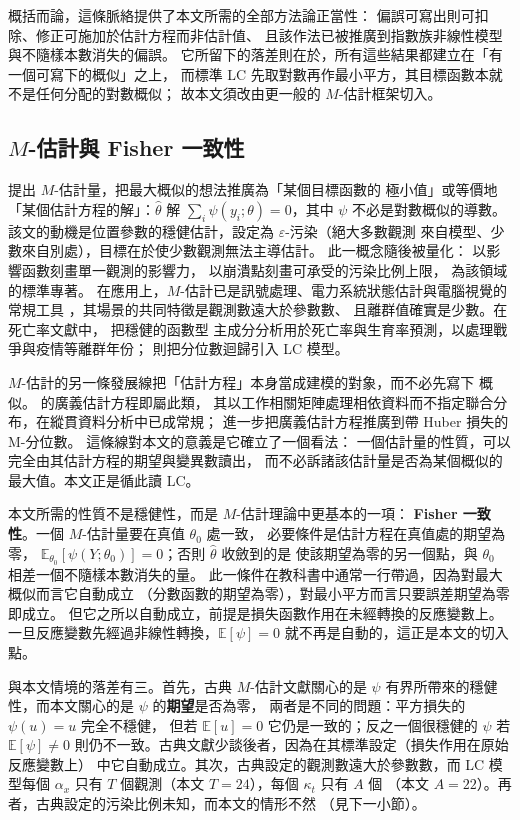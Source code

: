 \documentclass[UTF8, fontset=macnew, a4paper, 12pt]{ctexart}
\newcommand{\Ex}{\mathbb{E}}
\begin{document}
概括而論，這條脈絡提供了本文所需的全部方法論正當性：
偏誤可寫出則可扣除、修正可施加於估計方程而非估計值、
且該作法已被推廣到指數族非線性模型與不隨樣本數消失的偏誤。
它所留下的落差則在於，所有這些結果都建立在「有一個可寫下的概似」之上，
而標準 LC 先取對數再作最小平方，其目標函數本就不是任何分配的對數概似；
故本文須改由更一般的 $M$-估計框架切入。

\subsection{$M$-估計與 Fisher 一致性}

\citet{huber1964} 提出 $M$-估計量，把最大概似的想法推廣為「某個目標函數的
極小值」或等價地「某個估計方程的解」：$\hat\theta$ 解
$\sum_i\psi(y_i;\theta)=0$，其中 $\psi$ 不必是對數概似的導數。
該文的動機是位置參數的穩健估計，設定為 $\varepsilon$-污染（絕大多數觀測
來自模型、少數來自別處），目標在於使少數觀測無法主導估計。
此一概念隨後被量化：\citet{hampel1974} 以影響函數刻畫單一觀測的影響力，
\citet{donoho1983} 以崩潰點刻畫可承受的污染比例上限，
\citet{huber2009} 為該領域的標準專著。
在應用上，$M$-估計已是訊號處理、電力系統狀態估計與電腦視覺的常規工具
\citep{zoubir2018}，其場景的共同特徵是觀測數遠大於參數數、
且離群值確實是少數。在死亡率文獻中，\citet{hyndman2007} 把穩健的函數型
主成分分析用於死亡率與生育率預測，以處理戰爭與疫情等離群年份；
\citet{santolino2020} 則把分位數迴歸引入 LC 模型。

$M$-估計的另一條發展線把「估計方程」本身當成建模的對象，而不必先寫下
概似。\citet{liang1986} 的廣義估計方程即屬此類，
其以工作相關矩陣處理相依資料而不指定聯合分布，在縱貫資料分析中已成常規；
\citet{merlo2022} 進一步把廣義估計方程推廣到帶 Huber 損失的 M-分位數。
這條線對本文的意義是它確立了一個看法：
一個估計量的性質，可以完全由其估計方程的期望與變異數讀出，
而不必訴諸該估計量是否為某個概似的最大值。本文正是循此讀 LC。

本文所需的性質不是穩健性，而是 $M$-估計理論中更基本的一項：
\textbf{Fisher 一致性}。一個 $M$-估計量要在真值 $\theta_0$ 處一致，
必要條件是估計方程在真值處的期望為零，
$\Ex_{\theta_0}[\psi(Y;\theta_0)]=0$；否則 $\hat\theta$ 收斂到的是
使該期望為零的另一個點，與 $\theta_0$ 相差一個不隨樣本數消失的量。
此一條件在教科書中通常一行帶過，因為對最大概似而言它自動成立
（分數函數的期望為零），對最小平方而言只要誤差期望為零即成立。
但它之所以自動成立，前提是損失函數作用在未經轉換的反應變數上。
一旦反應變數先經過非線性轉換，$\Ex[\psi]=0$ 就不再是自動的，這正是本文的切入點。

與本文情境的落差有三。首先，古典 $M$-估計文獻關心的是
$\psi$ 有界所帶來的穩健性，而本文關心的是 $\psi$ 的\textbf{期望}是否為零，
兩者是不同的問題：平方損失的 $\psi(u)=u$ 完全不穩健，
但若 $\Ex[u]=0$ 它仍是一致的；反之一個很穩健的 $\psi$ 若 $\Ex[\psi]\ne0$
則仍不一致。古典文獻少談後者，因為在其標準設定（損失作用在原始反應變數上）
中它自動成立。其次，古典設定的觀測數遠大於參數數，而 LC 模型每個
$\alpha_x$ 只有 $T$ 個觀測（本文 $T=24$），每個 $\kappa_t$ 只有 $A$ 個
（本文 $A=22$）。再者，古典設定的污染比例未知，而本文的情形不然
（見下一小節）。
\end{document}
